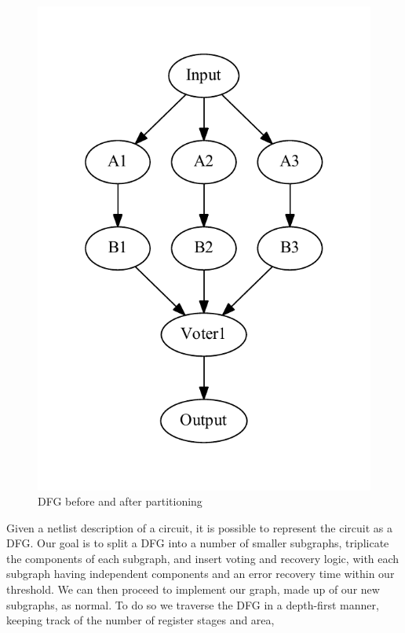 \documentclass[12pt,final,oneside,a4paper]{dwThesis} %
\begin{document}
\begin{figure}
\begin{center}
         \includegraphics[height=0.3\textheight]{images/TMR-post.pdf}
         \caption{\gls{DFG} before and after partitioning} \label{TMRFigure}

      \end{center}

   \end{figure}
   Given a netlist description of a circuit, it is
   possible to represent the circuit as a \gls{DFG}\cite{FPGAArch}. Our goal is
   to split a \gls{DFG} into a number of smaller subgraphs, triplicate the
   components of each subgraph, and insert voting and recovery logic, with each
   subgraph having independent components and an error recovery time within our
   threshold. We can then proceed to implement our graph, made up of our new
   subgraphs, as normal.  To do so we traverse the \gls{DFG} in a depth-first
   manner, keeping track of the number of register stages and area,
\end{document}
